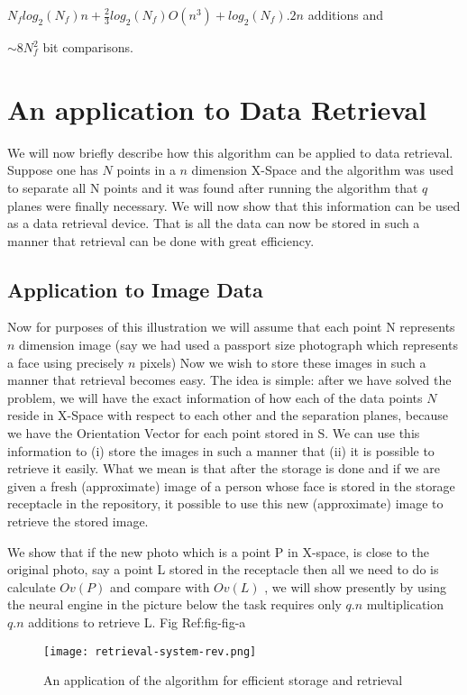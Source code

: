 \documentclass[english]{article}
\begin{document}
$N_{f}log_{2}(N_{f})n+\frac{2}{3}log_{2}(N_{f})O(n^{3})+log_{2}(N_{f}).2n$
additions and

$\sim8N_{f}^{2}$ bit comparisons.


\section{An application to Data Retrieval}

We will now briefly describe how this algorithm can be applied to
data retrieval. Suppose one has $N$ points in a $n$ dimension X-Space
and the algorithm was used to separate all N points and it was found
after running the algorithm that $q$ planes were finally necessary.
We will now show that this information can be used as a data retrieval
device. That is all the data can now be stored in such a manner that
retrieval can be done with great efficiency. 


\subsection{Application to Image Data}

Now for purposes of this illustration we will assume that each point
N represents $n$ dimension image (say we had used a passport size
photograph which represents a face using precisely $n$ pixels) Now
we wish to store these images in such a manner that retrieval becomes
easy. The idea is simple: after we have solved the problem, we will
have the exact information of how each of the data points $N$ reside
in X-Space with respect to each other and the separation planes, because
we have the Orientation Vector for each point stored in S. We can
use this information to (i) store the images in such a manner that
(ii) it is possible to retrieve it easily. What we mean is that after
the storage is done and if we are given a fresh (approximate) image
of a person whose face is stored in the storage receptacle in the
repository, it possible to use this new (approximate) image to retrieve
the stored image.

We show that if the new photo which is a point P in X-space, is close
to the original photo, say a point L stored in the receptacle then
all we need to do is calculate $Ov(P)$ and compare with $Ov(L)$
, we will show presently by using the neural engine in the picture
below the task requires only $q.n$ multiplication $q.n$ additions
to retrieve L. Fig Ref:fig-fig-a 

\medskip{}
\begin{figure}[htp]
 \begin{center}
\texttt{[image: retrieval-system-rev.png]}
\caption{An application of the algorithm for efficient storage and retrieval}


\label{fig:fig-a} \end{center}
\end{figure} 
\end{document}
